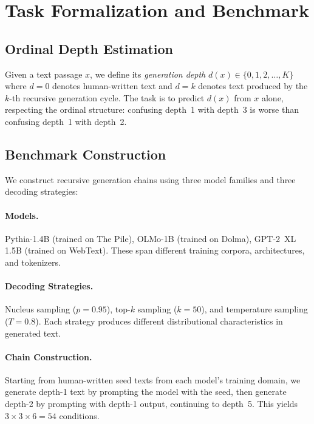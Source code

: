 \documentclass[11pt,a4paper]{article}
\begin{document}
\section{Task Formalization and Benchmark}

\subsection{Ordinal Depth Estimation}

Given a text passage $x$, we define its \emph{generation depth} $d(x) \in \{0, 1, 2, \ldots, K\}$ where $d=0$ denotes human-written text and $d=k$ denotes text produced by the $k$-th recursive generation cycle.
The task is to predict $d(x)$ from $x$ alone, respecting the ordinal structure: confusing depth~1 with depth~3 is worse than confusing depth~1 with depth~2.

\subsection{Benchmark Construction}

We construct recursive generation chains using three model families and three decoding strategies:

\paragraph{Models.} Pythia-1.4B (trained on The Pile), OLMo-1B (trained on Dolma), GPT-2~XL 1.5B (trained on WebText). These span different training corpora, architectures, and tokenizers.

\paragraph{Decoding Strategies.} Nucleus sampling ($p=0.95$), top-$k$ sampling ($k=50$), and temperature sampling ($T=0.8$). Each strategy produces different distributional characteristics in generated text.

\paragraph{Chain Construction.} Starting from human-written seed texts from each model's training domain, we generate depth-1 text by prompting the model with the seed, then generate depth-2 by prompting with depth-1 output, continuing to depth~5. This yields $3 \times 3 \times 6 = 54$ conditions.
\end{document}
